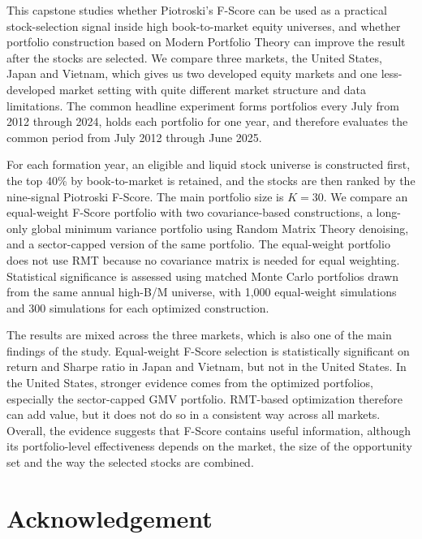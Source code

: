 \documentclass[11pt,a4paper]{report}
\numberwithin{figure}{chapter}
\numberwithin{table}{chapter}
\numberwithin{equation}{chapter}
\begin{document}
This capstone studies whether Piotroski's F-Score can be used as a practical stock-selection signal inside high book-to-market equity universes, and whether portfolio construction based on Modern Portfolio Theory can improve the result after the stocks are selected. We compare three markets, the United States, Japan and Vietnam, which gives us two developed equity markets and one less-developed market setting with quite different market structure and data limitations. The common headline experiment forms portfolios every July from 2012 through 2024, holds each portfolio for one year, and therefore evaluates the common period from July 2012 through June 2025.

For each formation year, an eligible and liquid stock universe is constructed first, the top 40\% by book-to-market is retained, and the stocks are then ranked by the nine-signal Piotroski F-Score. The main portfolio size is $K=30$. We compare an equal-weight F-Score portfolio with two covariance-based constructions, a long-only global minimum variance portfolio using Random Matrix Theory denoising, and a sector-capped version of the same portfolio. The equal-weight portfolio does not use RMT because no covariance matrix is needed for equal weighting. Statistical significance is assessed using matched Monte Carlo portfolios drawn from the same annual high-B/M universe, with 1,000 equal-weight simulations and 300 simulations for each optimized construction.

The results are mixed across the three markets, which is also one of the main findings of the study. Equal-weight F-Score selection is statistically significant on return and Sharpe ratio in Japan and Vietnam, but not in the United States. In the United States, stronger evidence comes from the optimized portfolios, especially the sector-capped GMV portfolio. RMT-based optimization therefore can add value, but it does not do so in a consistent way across all markets. Overall, the evidence suggests that F-Score contains useful information, although its portfolio-level effectiveness depends on the market, the size of the opportunity set and the way the selected stocks are combined.

\chapter*{Acknowledgement}
\end{document}
